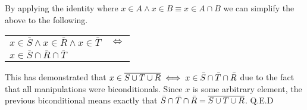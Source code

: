 By applying the identity where $x \in A \land x \in B \equiv x \in A \cap B$ we can simplify the
above to the following.

\begin{center}
\begin{tabular}{ll}
    $x \in \bar{S} \land x \in \bar{R} \land x \in \bar{T}$ & $\iff$ \\
    $x \in \bar{S} \cap \bar{R} \cap \bar{T}$
\end{tabular}   
\end{center}

This has demonstrated that $x \in \overline{S \cup T \cup R} \iff x \in \bar{S} \cap \bar{T} \cap \bar{R}$ due to the fact that all manipulations were biconditionals. Since $x$ is some arbitrary element, the previous biconditional means exactly that $ \bar{S} \cap \bar{T} \cap \bar{R} = \overline{S \cup T \cup R}$. Q.E.D